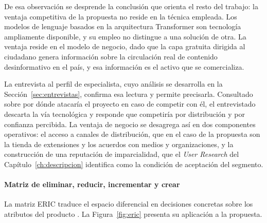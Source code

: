 De esa observación se desprende la conclusión que orienta el resto del trabajo: la ventaja competitiva de la propuesta no reside en la técnica empleada. Los modelos de lenguaje basados en la arquitectura Transformer son tecnología ampliamente disponible, y su empleo no distingue a una solución de otra. La ventaja reside en el modelo de negocio, dado que la capa gratuita dirigida al ciudadano genera información sobre la circulación real de contenido desinformativo en el país, y esa información es el activo que se comercializa.

La entrevista al perfil de especialista, cuyo análisis se desarrolla en la Sección~\ref{sec:entrevistas}, confirma esa lectura y permite precisarla. Consultado sobre por dónde atacaría el proyecto en caso de competir con él, el entrevistado descarta la vía tecnológica y responde que competiría por distribución y por confianza percibida. La ventaja de negocio se desagrega así en dos componentes operativos: el acceso a canales de distribución, que en el caso de la propuesta son la tienda de extensiones y los acuerdos con medios y organizaciones, y la construcción de una reputación de imparcialidad, que el \textit{User Research} del Capítulo~\ref{ch:descripcion} identifica como la condición de aceptación del segmento.

\paragraph{Matriz de eliminar, reducir, incrementar y crear}

La matriz ERIC traduce el espacio diferencial en decisiones concretas sobre los atributos del producto \parencite{KimMauborgne2015}. La Figura~\ref{fig:eric} presenta su aplicación a la propuesta.

